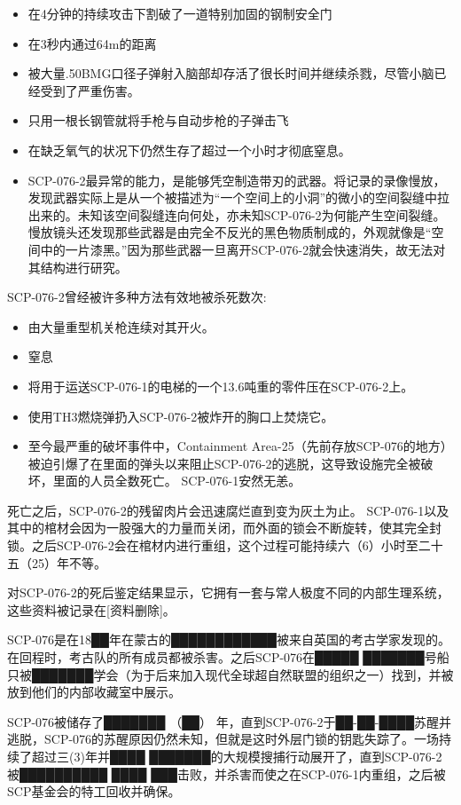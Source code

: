 \begin{itemize}
\item 在4分钟的持续攻击下割破了一道特别加固的钢制安全门
\item 在3秒内通过64m的距离
\item 被大量.50BMG口径子弹射入脑部却存活了很长时间并继续杀戮，尽管小脑已经受到了严重伤害。
\item 只用一根长钢管就将手枪与自动步枪的子弹击飞
\item 在缺乏氧气的状况下仍然生存了超过一个小时才彻底窒息。
\item SCP-076-2最异常的能力，是能够凭空制造带刃的武器。将记录的录像慢放，发现武器实际上是从一个被描述为“一个空间上的小洞”的微小的空间裂缝中拉出来的。未知该空间裂缝连向何处，亦未知SCP-076-2为何能产生空间裂缝。慢放镜头还发现那些武器是由完全不反光的黑色物质制成的，外观就像是“空间中的一片漆黑。”因为那些武器一旦离开SCP-076-2就会快速消失，故无法对其结构进行研究。
\end{itemize}

SCP-076-2曾经被许多种方法有效地被杀死数次:

\begin{itemize}
\item 由大量重型机关枪连续对其开火。
\item 窒息
\item 将用于运送SCP-076-1的电梯的一个13.6吨重的零件压在SCP-076-2上。
\item 使用TH3燃烧弹扔入SCP-076-2被炸开的胸口上焚烧它。
\item 至今最严重的破坏事件中，Containment Area-25（先前存放SCP-076的地方）被迫引爆了在里面的弹头以来阻止SCP-076-2的逃脱，这导致设施完全被破坏，里面的人员全数死亡。 SCP-076-1安然无恙。
\end{itemize}

死亡之后，SCP-076-2的残留肉片会迅速腐烂直到变为灰土为止。 SCP-076-1以及其中的棺材会因为一股强大的力量而关闭，而外面的锁会不断旋转，使其完全封锁。之后SCP-076-2会在棺材内进行重组，这个过程可能持续六（6）小时至二十五（25）年不等。

对SCP-076-2的死后鉴定结果显示，它拥有一套与常人极度不同的内部生理系统，这些资料被记录在{[}资料删除]。

\hr

SCP-076是在18██年在蒙古的████████████被来自英国的考古学家发现的。在回程时，考古队的所有成员都被杀害。之后SCP-076在█████ ███████号船只被███████学会（为于后来加入现代全球超自然联盟的组织之一）找到，并被放到他们的内部收藏室中展示。

SCP-076被储存了███████ （██） 年，直到SCP-076-2于██-██-████苏醒并逃脱，SCP-076的苏醒原因仍然未知，但就是这时外层门锁的钥匙失踪了。一场持续了超过三(3)年并████ ███████的大规模搜捕行动展开了，直到SCP-076-2被██████████ ████ ███击败，并杀害而使之在SCP-076-1内重组，之后被SCP基金会的特工回收并确保。

